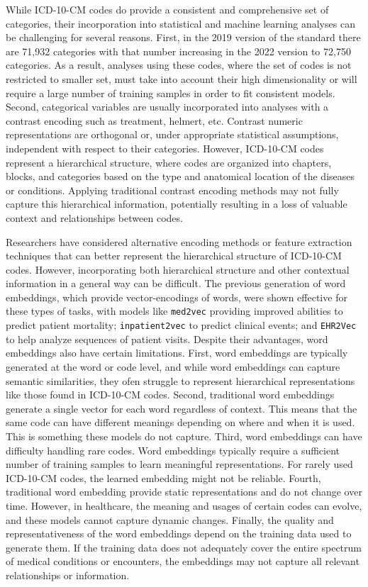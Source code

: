 \documentclass{bmcart}
\begin{document}
While ICD-10-CM codes do provide a consistent and comprehensive set of 
categories, their incorporation into statistical and machine learning analyses 
can be challenging for several reasons. First, in the 2019 version of the 
standard there are 71,932 categories with that number increasing
in the 2022 version to 72,750 categories. As a result, analyses 
using these codes, where the set of codes is not restricted to smaller set, 
must take into account their high dimensionality or will require a large 
number of training samples in order to fit consistent models. Second, 
categorical variables are usually incorporated into analyses with a contrast 
encoding such as treatment, helmert, etc. Contrast numeric 
representations are orthogonal or, under appropriate statistical assumptions, 
independent with respect to their categories. However, ICD-10-CM codes 
represent a hierarchical structure, 
where codes are organized into chapters, blocks, and categories based on the 
type and anatomical location of the diseases or conditions. Applying 
traditional contrast encoding methods may 
not fully capture this hierarchical information, potentially resulting in a 
loss of valuable context and relationships between codes.

Researchers have considered alternative encoding methods or feature extraction 
techniques that can better represent the hierarchical structure of ICD-10-CM 
codes. However, incorporating both hierarchical structure and other contextual 
information in a general way can be difficult. The previous generation of word 
embeddings, which provide vector-encodings of words, were shown effective for 
these types of tasks, with models like \texttt{med2vec} \cite{med2vec} 
providing improved abilities to predict patient mortality; 
\texttt{inpatient2vec} \cite{inpatient2vec} to predict clinical events; 
and \texttt{EHR2Vec} \cite{ehr2vec} to help analyze sequences of patient 
visits. Despite their advantages, word embeddings also have certain 
limitations. First, word embeddings are typically generated at the word or 
code level, and while word embeddings can capture semantic similarities, they 
ofen struggle to represent hierarchical representations like those found in 
ICD-10-CM codes. Second, traditional word embeddings generate a single vector 
for each word regardless of context. This means that 
the same code can have different meanings depending on where and when it is 
used. This is something these models do not capture. Third, word embeddings 
can have difficulty handling rare codes. Word embeddings typically require 
a sufficient number of training samples to learn meaningful representations. 
For rarely used ICD-10-CM codes, the learned embedding might not be reliable. 
Fourth, traditional word embedding provide static representations and do not change over time. However, in healthcare, the meaning and usages of certain codes can evolve, and these models cannot capture dynamic changes. 
Finally, the quality and representativeness of 
the word embeddings depend on the training data used to generate them. If the 
training data does not adequately cover the entire spectrum of medical 
conditions or encounters, the embeddings may not capture all relevant 
relationships or information. 
\end{document}
